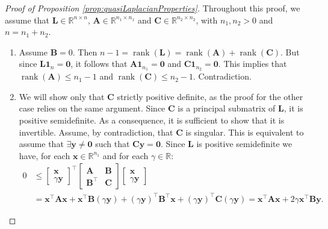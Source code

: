 \documentclass[12pt]{article}
\theoremstyle{plain}
\theoremstyle{remark}
\newcommand{\R}[0]{\mathbb{R}}
\newcommand{\onen}[0]{{\mathbf{1}_{n}}}
\newcommand{\dVec}[1]{{\bm{#1}}}            %
\newcommand{\latMatr}[1]{\mathbf{#1}}          %
\DeclareMathOperator{\rank}{rank}
\begin{document}
    \begin{proof}[Proof of Proposition \ref{prop:quasiLaplacianProperties}] 
        Throughout this proof, we assume that $\latMatr{L}\in \R^{n \times n}$, ${\latMatr{A}}\in \R^{n_1 \times n_1}$ and ${\latMatr{C}}\in \R^{n_2 \times n_2}$, with $n_1,n_2>0$ and $n=n_1+n_2$.\par
        \begin{enumerate}
            \item Assume ${\latMatr{B}}=0$. Then $n-1 = \rank({\latMatr{L}})=\rank({\latMatr{A}})+\rank({\latMatr{C}})$. But since $\latMatr L \onen=\dVec 0$, it follows that ${\latMatr{A}} \dVec {1}_{n_1}=\dVec 0$ and ${\latMatr{C}} \dVec 1_{n_2}= \dVec0$. This implies that $\rank({\latMatr{A}})\leq n_1-1$ and $\rank({\latMatr{C}})\leq n_2 -1$. Contradiction.
            \item We will show only that ${\latMatr{C}}$ strictly positive definite, as the proof for the other case relies on the same argument. Since $\latMatr C$ is a principal submatrix of $\latMatr L$, it is positive semidefinite. As a consequence, it is sufficient to show that it is invertible. Assume, by contradiction, that ${\latMatr{C}}$ is singular. This is equivalent to assume that $\exists \dVec y\ne \dVec 0$ such that ${\latMatr{C}} \dVec y=\dVec 0$. Since $\latMatr L$ is positive semidefinite we have, for each $\dVec x\in \R^{n_1}$ and for each $\gamma \in \R$:
            \begin{align*}
                0 &\leq \begin{bmatrix}
                    \dVec x \\
                    \gamma \dVec y
                \end{bmatrix}^\top 
                \begin{bmatrix}
                    {\latMatr{A}} & {\latMatr{B}}\\
                    {\latMatr{B}}^\top & {\latMatr{C}}
                \end{bmatrix}
                \begin{bmatrix}
                    \dVec x \\
                    \gamma \dVec y
                \end{bmatrix}\\
                &=\dVec x^\top {\latMatr{A}} \dVec x + \dVec x^\top {\latMatr{B}} (\gamma \dVec y) + (\gamma \dVec y)^\top {\latMatr{B}}^\top \dVec x + (\gamma \dVec y)^\top {\latMatr{C}} (\gamma \dVec y)=\dVec x^\top {\latMatr{A}} \dVec x + 2 \gamma \dVec x^\top {\latMatr{B}} \dVec y.

\end{align*}
\end{enumerate}
\end{proof}
\end{document}

